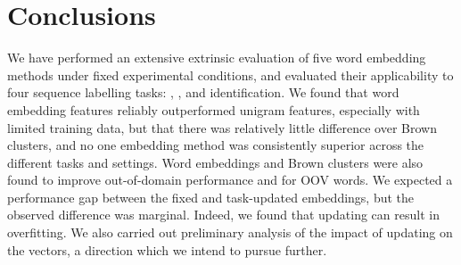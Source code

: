 \section{Conclusions}

We have performed an extensive extrinsic evaluation of five word embedding methods
under fixed experimental conditions, and evaluated their applicability to four sequence labelling tasks: \pos, \chunking, \ner and \mwe identification.
We found that word embedding features reliably outperformed unigram
features, especially with limited training data, but that there was
relatively little difference over Brown clusters, and
no one embedding method was consistently superior across the different tasks and settings.
Word embeddings and Brown clusters were also found to improve
out-of-domain performance and for OOV words.
We expected a performance gap between the fixed and task-updated embeddings, but the observed difference was marginal.
Indeed, we found that updating can result in overfitting.
We also carried out preliminary analysis of the impact of updating on
the vectors, a direction which we intend to pursue further.



